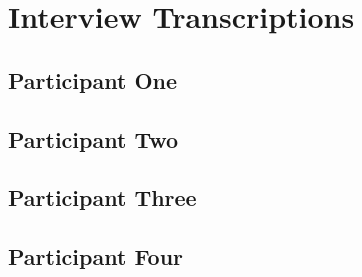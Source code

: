 \chapter{Interview Transcriptions}
\label{appx:transcriptions}
\section{Participant One}


\section{Participant Two}


\section{Participant Three}


\section{Participant Four}
% 

% 

% 
